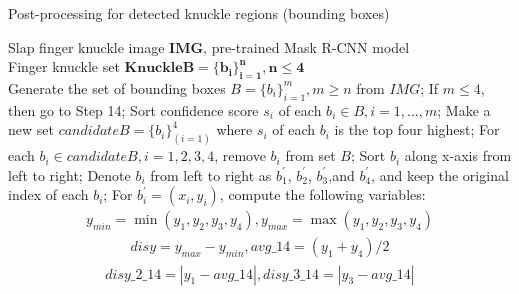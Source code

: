 \begin{algorithm}[ht!]
    \renewcommand{\algorithmicrequire}{\textbf{Input:}}
    \renewcommand{\algorithmicensure}{\textbf{Output:}}
    \caption{Post-processing for detected knuckle regions (bounding boxes)}
    \begin{algorithmic}[1]
        \REQUIRE Slap finger knuckle image $\bm{IMG}$, pre-trained Mask R-CNN model \\ 
        \ENSURE Finger knuckle set $\bm{KnuckleB = \{b_i\}_{i=1}^n, n\leq 4}$\\
        \STATE Generate the set of bounding boxes $B= \{b_i\}_{i=1}^m,m\geq n$ from $IMG$;
        \STATE If $m \leq 4$, then go to Step 14;
        \STATE Sort confidence score $s_i$ of each $b_i \in B, i = 1, ..., m$;
        \STATE Make a new set $candidateB= \{b_i\}_(i=1)^4$ where $s_i$ of each $b_i$ is the top four highest;
        \STATE For each $b_i \in candidateB, i=1,2,3,4$, remove $b_i$ from set $B$;
        \STATE Sort $b_i$ along x-axis from left to right;
        \STATE Denote $b_i$ from left to right as $b_1^{'}$, $b_2^{'}$, $b_3^{'}$,and $b_4^{'}$, and keep the original index of each $b_i$;
        \STATE For $b_i^{'}=(x_i,y_i)$, compute the following variables:\\
        \footnotesize{
            \vspace{-0.05in}
            \begin{equation}
                \begin{aligned}
                    y_{min}=\min (y_1, y_2, y_3, y_4), y_{max}= \max (y_1, y_2, y_3, y_4)
                \end{aligned}
                \label{equation-1}
            \end{equation}
            \vspace{-0.2in}
            \begin{equation}
                \begin{aligned}
                    disy = y_{max} - y_{min}, avg\_14=(y_1+y_4)/2
                \end{aligned}
                \label{equation-2}
            \end{equation}
            \vspace{-0.3in}
            \begin{equation}
                \begin{aligned}
                    disy\_2\_14 = \left|y_1-avg\_14\right|, disy\_3\_14=\left|y_3-avg\_14\right|
                \end{aligned}

\end{equation}}
\end{algorithmic}
\end{algorithm}
